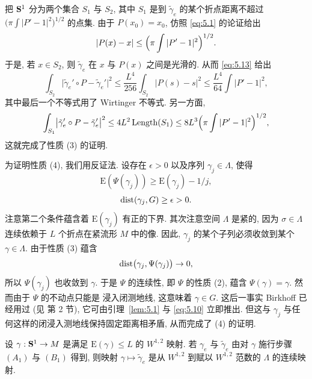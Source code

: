 把 $\mathbf{S}^1$ 分为两个集合 $S_1$ 与 $S_2$, 其中 $S_1$ 是到
$\tilde{\gamma}_e$ 的某个折点距离不超过
$\bigl(\pi\int|P'-1|^2\bigr)^{1/2}$ 的点集. 由于 $P(x_0)=x_0$, 仿照
\eqref{eq:5.1} 的论证给出
\begin{equation*}
|P(x)-x|\leq\Bigl(\pi\int|P'-1|^2\Bigr)^{1/2}.
\end{equation*}
于是, 若 $x\in S_2$, 则 $\tilde{\gamma}_e$ 在 $x$ 与 $P(x)$ 之间是光滑的.
从而 \eqref{eq:5.13} 给出
\begin{equation}
\int_{S_2}\bigl|\tilde{\gamma}_e'\circ P-\tilde{\gamma}_e'\bigr|^2
\leq\frac{L^4}{256}\int_{S_2}|P(s)-s|^2
\leq\frac{L^4}{64}\int|P'-1|^2,
\label{eq:5.14}
\end{equation}
其中最后一个不等式用了 Wirtinger 不等式. 另一方面,
\begin{equation}
\int_{S_1}\bigl|\tilde{\gamma}_e'\circ P-\tilde{\gamma}_e'\bigr|^2
\leq 4L^2\operatorname{Length}(S_1)
\leq 8L^3\Bigl(\pi\int|P'-1|^2\Bigr)^{1/2},
\label{eq:5.15}
\end{equation}
这就完成了性质 (3) 的证明.

为证明性质 (4), 我们用反证法. 设存在 $\epsilon>0$ 以及序列
$\gamma_j\in\Lambda$, 使得
\begin{equation}
\mathrm{E}(\Psi(\gamma_j))\geq\mathrm{E}(\gamma_j)-1/j,
\label{eq:5.16}
\end{equation}
\begin{equation}
\operatorname{dist}(\gamma_j,G)\geq\epsilon>0.
\label{eq:5.17}
\end{equation}
注意第二个条件蕴含着 $\mathrm{E}(\gamma_j)$ 有正的下界. 其次注意空间
$\Lambda$ 是紧的, 因为 $\sigma\in\Lambda$ 连续依赖于 $L$ 个折点在紧流形
$M$ 中的像. 因此, $\gamma_j$ 的某个子列必须收敛到某个
$\gamma\in\Lambda$. 由于性质 (3) 蕴含
\begin{equation*}
\operatorname{dist}\bigl(\gamma_j,\Psi(\gamma_j)\bigr)\to 0,
\end{equation*}
所以 $\Psi(\gamma_j)$ 也收敛到 $\gamma$. 于是 $\Psi$ 的连续性, 即 $\Psi$
的性质 (2), 蕴含 $\Psi(\gamma)=\gamma$. 然而由于 $\Psi$ 的不动点只能是
浸入闭测地线, 这意味着 $\gamma\in G$. 这后一事实 Birkhoff 已经用过
(见 \cite{Cr} 第 2 节), 它可由引理~\ref{lem:5.1} 与 \eqref{eq:5.10}
立即推出. 但这与 $\gamma_j$ 与任何这样的闭浸入测地线保持固定距离相矛盾,
从而完成了 (4) 的证明.


\begin{lemma}
\label{lem:5.3}
设 $\gamma:\mathbf{S}^1\to M$ 是满足 $\mathrm{E}(\gamma)\leq L$ 的 $W^{1,2}$
映射. 若 $\gamma_e$ 与 $\tilde{\gamma}_e$ 由对 $\gamma$ 施行步骤
$(A_1)$ 与 $(B_1)$ 得到, 则映射 $\gamma\mapsto\tilde{\gamma}_e$ 是从
$W^{1,2}$ 到赋以 $W^{1,2}$ 范数的 $\Lambda$ 的连续映射.
\end{lemma}

